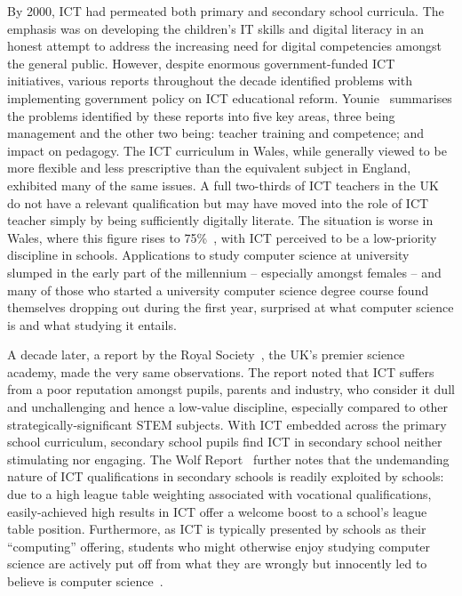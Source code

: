 \documentclass[conference]{IEEEtran}
\begin{document}
By 2000, ICT had permeated both primary and secondary school
curricula. The emphasis was
on developing the children's IT skills and digital literacy in an
honest attempt to address the increasing need for digital competencies
amongst the general public.  However, despite enormous
government-funded ICT initiatives, various reports throughout the
decade identified problems with implementing government policy on ICT
educational reform.
Younie~\cite{Younie:2006} summarises the problems
identified by these reports into five key areas, three being
management and the other two being: teacher training and competence;
and impact on pedagogy.  The ICT curriculum in
Wales, %
while generally viewed to be more
flexible and less prescriptive than the equivalent subject in England,
exhibited many of the same
issues. %
A full two-thirds of ICT teachers in the UK do not have a relevant
qualification but may have moved into the role of ICT teacher simply
by being sufficiently digitally literate. %
The situation is worse in Wales, where this figure rises to
75\%~\cite{GTCW:2008}, with ICT perceived to be a low-priority
discipline in schools. Applications to study computer science at
university slumped in the early part of the millennium -- especially
amongst females -- and many of those who started a university computer
science degree course found themselves dropping out during the first
year, surprised at what computer science is and what studying it
entails.

A decade later, a report by the Royal Society~\cite{RoyalSoc:2012},
the UK's premier science academy, made the very same observations.
The report noted that ICT suffers from a poor reputation amongst
pupils, parents and industry, who consider it dull and unchallenging
and hence a low-value discipline, especially compared to other
strategically-significant STEM subjects.  With ICT embedded across the
primary school curriculum, secondary school pupils find ICT in
secondary school neither stimulating nor engaging. The Wolf
Report~\cite{Wolf:2011} further notes that the undemanding nature of
ICT qualifications in secondary schools is readily exploited by schools:
due to a high league table weighting associated with
vocational qualifications, easily-achieved high results in ICT offer a
welcome boost to a school's league table position. Furthermore, as ICT
is typically presented by schools as their ``computing'' offering,
students who might otherwise enjoy studying computer science are
actively put off from what they are wrongly but innocently
led to believe is computer
science~\cite{crick+sentance:2011,brown-et-al-sigcse2012}.
\end{document}
